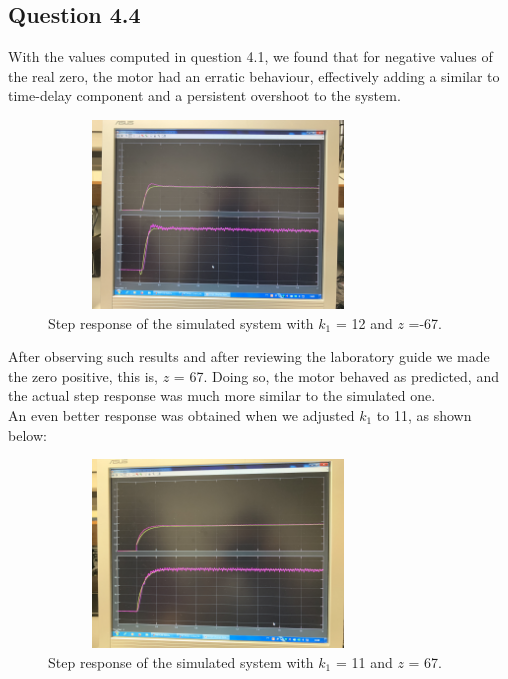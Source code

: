 \documentclass[a4paper,8pt]{extarticle}
\begin{document}
        \subsection*{Question 4.4}
        With the values computed in question 4.1, we found that for negative values of the real zero, the motor had an erratic behaviour, effectively adding a similar to time-delay component and a persistent overshoot to the system.\\
        \begin{figure}[ht]
            \centering
             \captionsetup{justification=centering,margin=2cm}
            \includegraphics[width=9cm,height=5cm]{negativezero.jpg} 
            \caption{Step response of the simulated system with $k_1$ = 12 and $z$ =-67.}
        \end{figure}
        After observing such results and after reviewing the laboratory guide we made the zero positive, this is, $z$ = 67. Doing so, the motor behaved as predicted, and the actual step response was much more similar to the simulated one.
        \\ An even better response was obtained when we adjusted $k_{1}$ to 11, as shown below:
            \begin{figure}[ht]
            \centering
             \captionsetup{justification=centering,margin=2cm}
            \includegraphics[width=9cm,height=5cm]{4_4.jpg} 
            \caption{Step response of the simulated system with $k_1$ = 11 and $z$ = 67.}
        \end{figure}
        \clearpage
\end{document}
